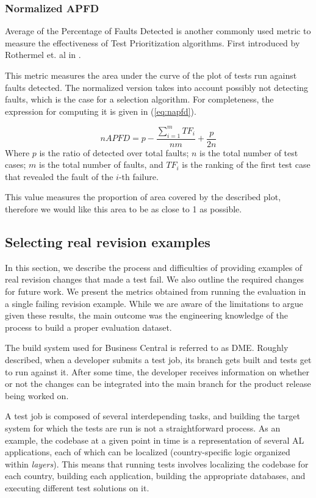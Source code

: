 \documentclass{article}
\begin{document}
\subsubsection{Normalized APFD}
Average of the Percentage of Faults Detected is another commonly used metric to measure the effectiveness of Test Prioritization algorithms. First introduced by Rothermel et. al in \cite{962562}.

This metric measures the area under the curve of the plot of tests run against faults detected. The normalized version takes into account possibly not detecting faults, which is the case for a selection algorithm. For completeness, the expression for computing it is given in (\ref{eq:napfd}).

\begin{equation}
  \label{eq:napfd}
    nAPFD = p - \frac{\sum_{i=1}^{m}TF_i}{nm}+\frac{p}{2n}
\end{equation}
Where $p$ is the ratio of detected over total faults; $n$ is the total number of test cases; $m$ is the total number of faults, and $TF_i$ is the ranking of the first test case that revealed the fault of the $i$-th failure.

This value measures the proportion of area covered by the described plot, therefore we would like this area to be as close to 1 as possible.

\subsection{Selecting real revision examples}\label{section:evaluation-real}
In this section, we describe the process and difficulties of providing examples of real revision changes that made a test fail. We also outline the required changes for future work. We present the metrics obtained from running the evaluation in a single failing revision example. While we are aware of the limitations to argue given these results, the main outcome was the engineering knowledge of the process to build a proper evaluation dataset.

The build system used for Business Central is referred to as DME. Roughly described, when a developer submits a test job, its branch gets built and tests get to run against it. After some time, the developer receives information on whether or not the changes can be integrated into the main branch for the product release being worked on.

A test job is composed of several interdepending tasks, and building the target system for which the tests are run is not a straightforward process. As an example, the codebase at a given point in time is a representation of several AL applications, each of which can be localized (country-specific logic organized within \emph{layers}). This means that running tests involves localizing the codebase for each country, building each application, building the appropriate databases, and executing different test solutions on it.
\end{document}
